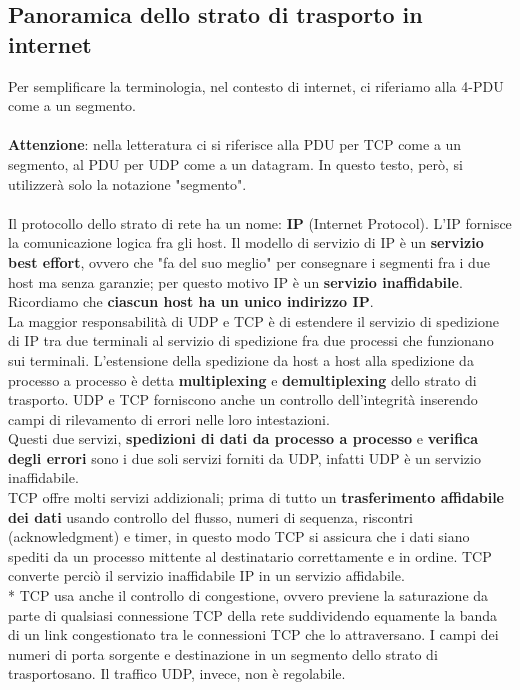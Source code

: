 \documentclass[11pt,a4paper]{book}
\begin{document}
\subsection{Panoramica dello strato di trasporto in internet}
Per semplificare la terminologia, nel contesto di internet, ci riferiamo alla 4-PDU come a un segmento. \\ \\
\textbf{Attenzione}: nella letteratura ci si riferisce alla PDU per TCP come a un segmento, al PDU per UDP come a un datagram. In questo testo, però, si utilizzerà solo la notazione "segmento".\\ \\
Il protocollo dello strato di rete ha un nome: \textbf{IP} (Internet Protocol). L'IP fornisce la comunicazione logica fra gli host. Il modello di servizio di IP è un \textbf{servizio best effort}, ovvero che "fa del suo meglio" per consegnare i segmenti fra i due host ma senza garanzie; per questo motivo IP è un \textbf{servizio inaffidabile}. Ricordiamo che \textbf{ciascun host ha un unico indirizzo IP}.\\
La maggior responsabilità di UDP e TCP è di estendere il servizio di spedizione di IP tra due terminali al servizio di spedizione fra due processi che funzionano sui terminali. L'estensione della spedizione da host a host alla spedizione da processo a processo è detta \textbf{multiplexing} e \textbf{demultiplexing} dello strato di trasporto. UDP e TCP forniscono anche un controllo dell'integrità inserendo campi di rilevamento di errori nelle loro intestazioni. \\
Questi due servizi, \textbf{spedizioni di dati da processo a processo} e \textbf{verifica degli errori} sono i due soli servizi forniti da UDP, infatti UDP è un servizio inaffidabile.\\
TCP offre molti servizi addizionali; prima di tutto un \textbf{trasferimento affidabile dei dati} usando controllo del flusso, numeri di sequenza, riscontri (acknowledgment) e timer, in questo modo TCP si assicura che i dati siano spediti da un processo mittente al destinatario correttamente e in ordine. TCP converte perciò il servizio inaffidabile IP in un servizio affidabile. \\*
TCP usa anche il controllo di congestione, ovvero previene la saturazione da parte di qualsiasi connessione TCP della rete suddividendo equamente la banda di un link congestionato tra le connessioni TCP che lo attraversano. I campi dei numeri di porta sorgente e destinazione in un segmento dello strato di trasportosano. Il traffico UDP, invece, non è regolabile.
\end{document}
